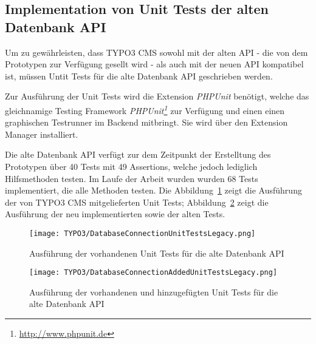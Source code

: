 \subsection{Implementation von Unit Tests der alten Datenbank API}
\label{prototype:sec:createTestForOldAPI}
Um zu gewährleisten, dass TYPO3 CMS sowohl mit der alten API - die von dem Prototypen zur Verfügung gesellt wird - als auch mit der neuen API kompatibel ist, müssen Untit Tests für die alte Datenbank API geschrieben werden.

Zur Ausführung der Unit Tests wird die Extension \textit{PHPUnit} benötigt, welche das gleichnamige Testing Framework \textit{PHPUnit\footnote{\url{http://www.phpunit.de}}} zur Verfügung und einen einen graphischen Testrunner im Backend mitbringt. Sie wird über den Extension Manager installiert.

Die alte Datenbank API verfügt zur dem Zeitpunkt der Erstelltung des Prototypen über 40 Tests mit 49 Assertions, welche jedoch lediglich Hilfsmethoden testen. Im Laufe der Arbeit wurden wurden 68 Tests implementiert, die alle Methoden testen. Die Abbildung~\ref{fig:executeUnitTestsForOldAPI} zeigt die Ausführung der von TYPO3 CMS mitgelieferten Unit Tests; Abbildung~\ref{fig:executeNewUnitTestsForOldAPI} zeigt die Ausführung der neu implementierten sowie der alten Tests.

\begin{figure}[H]
    \centering
    \texttt{[image: TYPO3/DatabaseConnectionUnitTestsLegacy.png]}
    \caption{Ausführung der vorhandenen Unit Tests für die alte Datenbank API}
    \label{fig:executeUnitTestsForOldAPI}
\end{figure}

\begin{figure}[H]
    \centering
    \texttt{[image: TYPO3/DatabaseConnectionAddedUnitTestsLegacy.png]}
    \caption{Ausführung der vorhandenen und hinzugefügten Unit Tests für die alte Datenbank API}
    \label{fig:executeNewUnitTestsForOldAPI}
\end{figure}
